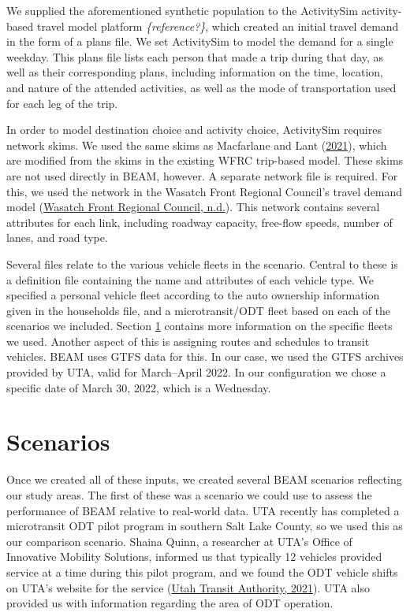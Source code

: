 \documentclass[
]{report}
\begin{document}
We supplied the aforementioned synthetic population to the ActivitySim activity-based travel model platform \emph{\{reference?\}}, which created an initial travel demand in the form of a plans file. We set ActivitySim to model the demand for a single weekday. This plans file lists each person that made a trip during that day, as well as their corresponding plans, including information on the time, location, and nature of the attended activities, as well as the mode of transportation used for each leg of the trip.

In order to model destination choice and activity choice, ActivitySim requires network skims. We used the same skims as Macfarlane and Lant (\protect\hyperlink{ref-MacfarlaneLant}{2021}), which are modified from the skims in the existing WFRC trip-based model. These skims are not used directly in BEAM, however. A separate network file is required. For this, we used the network in the Wasatch Front Regional Council's travel demand model (\protect\hyperlink{ref-WFRCnetwork}{Wasatch Front Regional Council, n.d.}). This network contains several attributes for each link, including roadway capacity, free-flow speeds, number of lanes, and road type.

Several files relate to the various vehicle fleets in the scenario. Central to these is a definition file containing the name and attributes of each vehicle type. We specified a personal vehicle fleet according to the auto ownership information given in the households file, and a microtransit/ODT fleet based on each of the scenarios we included. Section \ref{scenario-configuration} contains more information on the specific fleets we used. Another aspect of this is assigning routes and schedules to transit vehicles. BEAM uses GTFS data for this. In our case, we used the GTFS archives provided by UTA, valid for March--April 2022. In our configuration we chose a specific date of March 30, 2022, which is a Wednesday.

\hypertarget{scenario-configuration}{%
\section{Scenarios}\label{scenario-configuration}}

Once we created all of these inputs, we created several BEAM scenarios reflecting our study areas. The first of these was a scenario we could use to assess the performance of BEAM relative to real-world data. UTA recently has completed a microtransit ODT pilot program in southern Salt Lake County, so we used this as our comparison scenario. Shaina Quinn, a researcher at UTA's Office of Innovative Mobility Solutions, informed us that typically 12 vehicles provided service at a time during this pilot program, and we found the ODT vehicle shifts on UTA's website for the service (\protect\hyperlink{ref-SLCSouth}{Utah Transit Authority, 2021}). UTA also provided us with information regarding the area of ODT operation.
\end{document}
